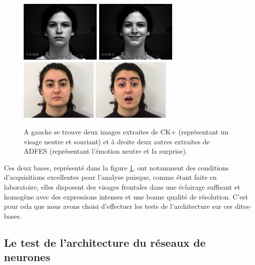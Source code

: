 \documentclass[12pt]{article}
\begin{document}
\begin{figure}
    \includegraphics[height=3cm]{data/img_0012_ck.png}
    \includegraphics[height=3cm]{data/img_0122_ck.png}
    \includegraphics[height=3cm]{data/img_0012_adfes.png}
    \includegraphics[height=3cm]{data/img_1502_adfes.png}
    \caption{A gauche se trouve deux images extraites de CK+ (représentant un visage neutre et souriant) et à droite deux autres extraites de ADFES (représentant l'émotion neutre et la surprise).}
    \label{datas}
\end{figure}

Ces deux bases, représenté dans la figure \ref{datas}, ont notamment des conditions d'acquisitions excellentes pour l'analyse puisque, comme étant faite en laboratoire, elles disposent des visages frontales dans une éclairage suffisant et homogène avec des expressions intenses et une bonne qualité de résolution. C'est pour cela que nous avons choisi d'effectuer les tests de l'architecture sur ces dites-bases.

\subsection{Le test de l'architecture du réseaux de neurones}
\end{document}
